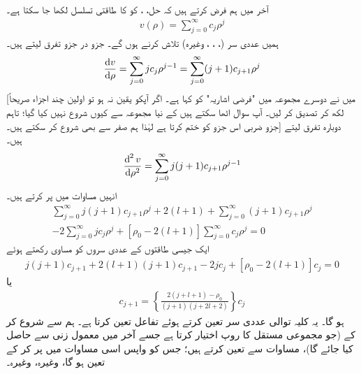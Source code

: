   آخر میں ہم فرض کرتے ہیں کہ حل،   ،  کو  کا طاقتی تسلسل لکھا جا سکتا ہے۔
  \begin{align}
v(\rho)=\sum_{j=0}^{\infty}c_{j}\rho^{j} 
\end{align}
ہمیں عددی سر (، ، ، وغیرہ) تلاش کرنے ہوں گے۔  جزو در جزو تفرق لیتے ہیں۔
\begin{align*}
\frac{\dif{v}}{\dif{\rho}}=\sum_{j=0}^{\infty}jc_{j}\rho^{j-1}=\sum_{j=0}^{\infty}(j+1)c_{j+1}\rho^{j} 
\end{align*}
[میں نے دوسرے مجموعہ میں "فرضی اشاریہ"  کو  کہا ہے۔ اگر آپکو یقین نہ  ہو تو اولین چند اجزاء صریحاً لکھ کر تصدیق کر لیں۔ آپ سوال اٹھا سکتے ہیں کے نیا مجموعہ   سے کیوں  شروع نہیں کیا گیا؛ تاہم جزو ضربی   اس جزو کو ختم کرتا ہے لہٰذا ہم صفر سے بھی شروع کر سکتے ہیں۔] دوبارہ تفرق لیتے ہیں۔
\begin{align*}
\frac{\dif^{\,2}{v}}{\dif{\rho^{2}}}=\sum_{j=0}^{\infty}j(j+1)c_{j+1}\rho^{j-1} 
\end{align*}
انہیں مساوات  میں پر کرتے ہیں۔
\begin{multline*}
\sum_{j=0}^{\infty}j(j+1)c_{j+1}\rho^{j}+2(l+1)+\sum_{j=0}^{\infty}(j+1)c_{j+1}\rho^{j} \\
-2\sum_{j=0}^{\infty}jc_{j}\rho^{j}+[\rho_{0}-2(l+1)]\sum_{j=0}^{\infty}c_{j}\rho^{j}=0 
\end{multline*}
ایک جیسی طاقتوں کے عددی سروں کو مساوی رکھتے ہوئے
\begin{align*}
j(j+1)c_{j+1}+2(l+1)(j+1)c_{j+1}-2jc_{j}+[\rho_{0}-2(l+1)]c_{j}=0 
\end{align*}
یا
\begin{align}\label{مساوات_ابعادی_کولمب_کلیہ_توالی}
c_{j+1}=\left\{\frac{2(j+l+1)-\rho_{0}}{(j+1)(j+2l+2)}\right\}c_{j} 
\end{align}
ہو گا۔ یہ کلیہ توالی عددی سر تعین کرتے ہوئے تفاعل  تعین کرتا ہے۔ ہم  سے شروع کر کے (جو مجموعی مستقل کا روپ اختیار کرتا ہے جسے آخر میں معمول زنی سے حاصل کیا جائے گا)، مساوات   سے  تعین کرتے ہیں؛ جس کو واپس اسی مساوات میں پر کر کے  تعین ہو گا، وغیرہ، وغیرہ۔

